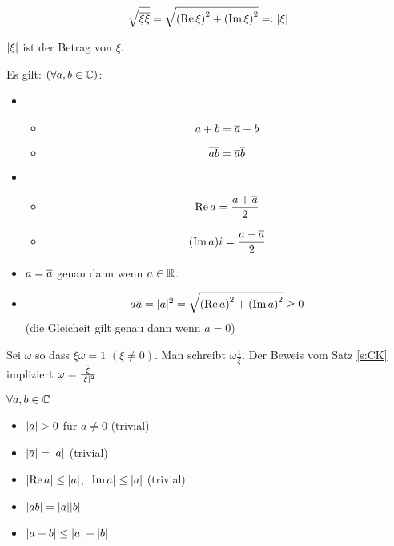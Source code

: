 \begin{Bem}
  \[\sqrt{\overline{\xi}\overline{\xi}}=\sqrt{\left( \operatorname{Re}\xi \right)^2+\left( \operatorname{Im}\xi \right)^2}=:\mathopen| \xi \mathclose|\]
\end{Bem}
\begin{Def}
  $\mathopen| \xi \mathclose|$ ist der Betrag von $\xi$.
\end{Def}
\begin{Sat}
  Es gilt: $(\forall a,b\in\mathbb{C})$:
  \begin{itemize}
    \item 
      \begin{itemize}
        \item \[\overline{a+b}=\overline{a}+\overline{b}\]
        \item \[\overline{ab}=\overline{a}\overline{b}\]
      \end{itemize}
    \item 
      \begin{itemize}
        \item \[\operatorname{Re} a =\frac{a+\overline{a}}{2}\]
        \item \[(\operatorname{Im} a) i=\frac{a-\overline{a}}{2}\]
      \end{itemize}
    \item $a=\overline{a}$ genau dann wenn $a\in\mathbb{R}$.
    \item \[a\overline{a}=\mathopen| a \mathclose|^2=\sqrt{\left( \operatorname{Re} a \right)^2+\left( \operatorname{Im} a \right)^2}\geq 0\]
      (die Gleicheit gilt genau dann wenn $a=0$)
  \end{itemize}
\end{Sat}
\begin{Bem}
  Sei $\omega$ so dass $\xi\omega=1$ $(\xi\neq 0)$. Man schreibt $\omega\frac{1}{\xi}$.
Der Beweis vom Satz \ref{s:CK} impliziert $\omega=\frac{\overline{\xi}}{\mathopen| \xi \mathclose|^2}$
\end{Bem}
\begin{Sat}
  $\forall a,b\in\mathbb{C}$
  \begin{itemize}
    \item $\abs{a}>0$ für $a\neq 0$ (trivial)
    \item $\mathopen| \overline{a} \mathclose|=\mathopen| a \mathclose|$ (trivial)
    \item $\mathopen| \operatorname{Re} a \mathclose|\leq\mathopen| a \mathclose|$, $\mathopen| \operatorname{Im} a \mathclose|\leq\mathopen| a \mathclose|$ (trivial)
    \item $\mathopen| ab \mathclose|=\mathopen| a \mathclose|\mathopen| b \mathclose|$
    \item $\mathopen| a+b \mathclose|\leq\mathopen| a \mathclose|+\mathopen| b \mathclose|$
  \end{itemize}
\end{Sat}
